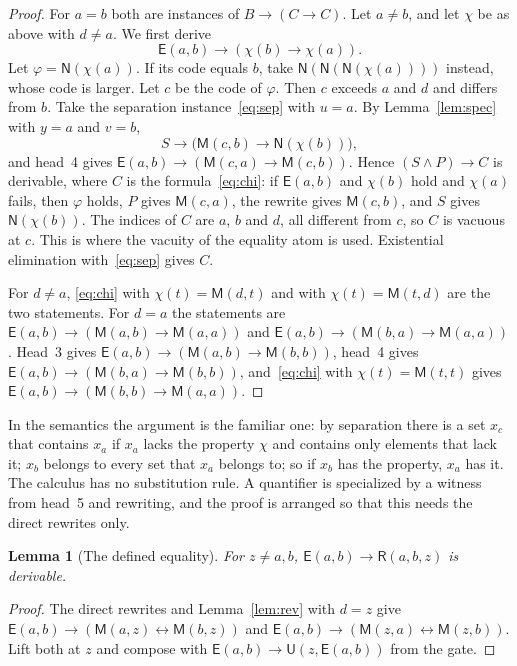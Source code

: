 \documentclass[11pt,letterpaper]{article}
\newtheorem{lemma}[theorem]{Lemma}
\newcommand{\Mc}{\mathsf{M}}
\newcommand{\Uc}{\mathsf{U}}
\newcommand{\Ec}{\mathsf{E}}
\newcommand{\Nc}{\mathsf{N}}
\newcommand{\Rc}{\mathsf{R}}
\begin{document}
\begin{proof}
For $a=b$ both are instances of $B\to(C\to C)$. Let $a\ne b$, and let
$\chi$ be as above with $d\ne a$. We first derive
\begin{equation}\label{eq:chi}
 \Ec(a,b)\to(\chi(b)\to\chi(a)).
\end{equation}
Let $\varphi=\Nc(\chi(a))$. If its code equals $b$, take
$\Nc(\Nc(\Nc(\chi(a))))$ instead, whose code is larger. Let $c$ be the
code of $\varphi$. Then $c$ exceeds $a$ and $d$ and differs from $b$.
Take the separation instance~\eqref{eq:sep} with $u=a$. By
Lemma~\ref{lem:spec} with $y=a$ and $v=b$,
\[
 S\to\bigl(\Mc(c,b)\to\Nc(\chi(b))\bigr),
\]
and head~4 gives $\Ec(a,b)\to(\Mc(c,a)\to\Mc(c,b))$. Hence
$(S\wedge P)\to C$ is derivable, where $C$ is the
formula~\eqref{eq:chi}: if $\Ec(a,b)$ and $\chi(b)$ hold and
$\chi(a)$ fails, then $\varphi$ holds, $P$ gives $\Mc(c,a)$, the
rewrite gives $\Mc(c,b)$, and $S$ gives $\Nc(\chi(b))$. The indices
of $C$ are $a$, $b$ and $d$, all different from $c$, so $C$ is vacuous
at $c$. This is where the vacuity of the equality atom is used.
Existential elimination with~\eqref{eq:sep} gives $C$.

For $d\ne a$, \eqref{eq:chi} with $\chi(t)=\Mc(d,t)$ and with
$\chi(t)=\Mc(t,d)$ are the two statements. For $d=a$ the statements
are $\Ec(a,b)\to(\Mc(a,b)\to\Mc(a,a))$ and
$\Ec(a,b)\to(\Mc(b,a)\to\Mc(a,a))$. Head~3 gives
$\Ec(a,b)\to(\Mc(a,b)\to\Mc(b,b))$, head~4 gives
$\Ec(a,b)\to(\Mc(b,a)\to\Mc(b,b))$, and~\eqref{eq:chi} with
$\chi(t)=\Mc(t,t)$ gives $\Ec(a,b)\to(\Mc(b,b)\to\Mc(a,a))$.
\end{proof}

In the semantics the argument is the familiar one: by separation there
is a set $x_c$ that contains $x_a$ if $x_a$ lacks the property $\chi$
and contains only elements that lack it; $x_b$ belongs to every set
that $x_a$ belongs to; so if $x_b$ has the property, $x_a$ has it. The
calculus has no substitution rule. A quantifier is specialized by a
witness from head~5 and rewriting, and the proof is arranged so that
this needs the direct rewrites only.

\begin{lemma}[The defined equality]\label{lem:nbhd}
For $z\ne a,b$, $\Ec(a,b)\to\Rc(a,b,z)$ is derivable.
\end{lemma}

\begin{proof}
The direct rewrites and Lemma~\ref{lem:rev} with $d=z$ give
$\Ec(a,b)\to(\Mc(a,z)\leftrightarrow\Mc(b,z))$ and
$\Ec(a,b)\to(\Mc(z,a)\leftrightarrow\Mc(z,b))$. Lift both at $z$ and
compose with $\Ec(a,b)\to\Uc(z,\Ec(a,b))$ from the gate.
\end{proof}
\end{document}
